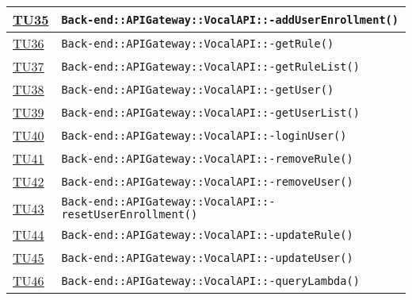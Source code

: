 \begin{longtable}{|>{\centering}m{1cm}|m{12cm}<{\centering}|}
\hyperlink{TU35}{TU35} & \texttt{Back-end::APIGateway::VocalAPI::-\linebreak addUserEnrollment()}\\ \hline

\hyperlink{TU36}{TU36} & \texttt{Back-end::APIGateway::VocalAPI::-\linebreak getRule()}\\ \hline

\hyperlink{TU37}{TU37} & \texttt{Back-end::APIGateway::VocalAPI::-\linebreak getRuleList()}\\ \hline

\hyperlink{TU38}{TU38} & \texttt{Back-end::APIGateway::VocalAPI::-\linebreak getUser()}\\ \hline

\hyperlink{TU39}{TU39} & \texttt{Back-end::APIGateway::VocalAPI::-\linebreak getUserList()}\\ \hline

\hyperlink{TU40}{TU40} & \texttt{Back-end::APIGateway::VocalAPI::-\linebreak loginUser()}\\ \hline

\hyperlink{TU41}{TU41} & \texttt{Back-end::APIGateway::VocalAPI::-\linebreak removeRule()}\\ \hline

\hyperlink{TU42}{TU42} & \texttt{Back-end::APIGateway::VocalAPI::-\linebreak removeUser()}\\ \hline

\hyperlink{TU43}{TU43} & \texttt{Back-end::APIGateway::VocalAPI::-\linebreak resetUserEnrollment()}\\ \hline

\hyperlink{TU44}{TU44} & \texttt{Back-end::APIGateway::VocalAPI::-\linebreak updateRule()}\\ \hline

\hyperlink{TU45}{TU45} & \texttt{Back-end::APIGateway::VocalAPI::-\linebreak updateUser()}\\ \hline

\hyperlink{TU46}{TU46} & \texttt{Back-end::APIGateway::VocalAPI::-\linebreak queryLambda()}\\ \hline


\end{longtable}
